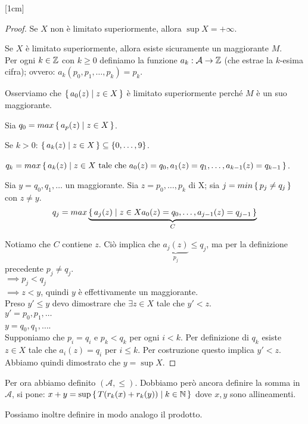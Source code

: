 [1cm]
\begin{proof}
Se $X$ non è limitato superiormente, allora $\sup X = +\infty$.

Se $X$ è limitato superiormente, allora esiste sicuramente un maggiorante $M$. \\
Per ogni $k \in \mathbb Z$ con $k \ge 0$ definiamo la funzione $a_k : \mathcal{A} \rightarrow \mathbb Z$ (che estrae la $k$-esima cifra); ovvero: $a_k(p_0, p_1, \dots, p_k) = p_k$.

Osserviamo che $\set{a_0(z) | z \in X}$ è limitato superiormente perché $M$ è un suo maggiorante.

Sia $q_0 = max \set{a_p(z) | z \in X}$.

Se $k > 0$: $\set{a_k(z) | z \in X} \subseteq \{0, \dots, 9\}$.

$q_k = max \set{a_k(z) | z \in X \text{ tale che } a_0(z)=q_0, a_1(z)=q_1, \dots, a_{k-1}(z) = q_{k-1}}$.

Sia $y = q_0, q_1, \dots$ un maggiorante.
Sia $z = p_0, \dots, p_k$ di X; sia $j = min \set{p_j \neq q_j}$ con $z \neq y$.
\begin{equation*}
q_j = max \underbrace{\set{a_j(z) | z \in X a_0(z) = q_0, \dots, a_{j-1}(z) = q_{j-1}}}_{C}
\end{equation*}

Notiamo che $C$ contiene $z$. Ciò implica che $\underbrace{a_j(z)}_{p_j} \le q_j$, ma per la definizione precedente $p_j \neq q_j$. \\
$\implies p_j < q_j$ \\
$\implies z < y$, quindi $y$ è effettivamente un maggiorante. \\

Preso $y' \le y$ devo dimostrare che $\exists z \in X$ tale che $y' < z$. \\
$y' = p_0, p_1, \dots$ \\
$y = q_0, q_1, \dots$.\\
Supponiamo che $p_i = q_i$ e $p_k < q_k$ per ogni $i < k$. Per definizione di $q_k$ esiste $z \in X$ tale che $a_i(z) = q_i$ per $i \le k$. Per costruzione questo implica $y' < z$. Abbiamo quindi dimostrato che $y = \sup X$.
\end{proof}

Per ora abbiamo definito $(\mathcal{A}, \le)$. Dobbiamo però ancora definire la somma in $\mathcal{A}$, si pone: $x + y = \sup \set{T(r_k(x)+r_k(y)) | k \in \mathbb N}$ dove $x, y$ sono allineamenti. 

Possiamo inoltre definire in modo analogo il prodotto.

